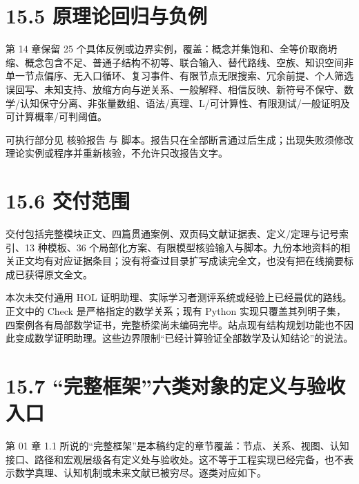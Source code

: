\documentclass[UTF8,a4paper,zihao=-4,fontset=windows,openany]{ctexbook}
\begin{document}
\section{15.5 原理论回归与负例}
第 14 章保留 25 个具体反例或边界实例，覆盖：概念并集饱和、全等价取商坍缩、概念包含不足、普通子结构不初等、联合输入、替代路线、空族、知识空间非单一节点偏序、无入口循环、复习事件、有限节点无限搜索、冗余前提、个人筛选误回写、未知支持、放缩方向与逆关系、一般解释、相信反映、新符号不保守、数学/认知保守分离、非张量数组、语法/真理、L/可计算性、有限测试/一般证明及可计算概率/可判阈值。

可执行部分见 核验报告 与 脚本。报告只在全部断言通过后生成；出现失败须修改理论实例或程序并重新核验，不允许只改报告文字。

\section{15.6 交付范围}
交付包括完整模块正文、四篇贯通案例、双页码文献证据表、定义/定理与记号索引、13 种模板、36 个局部化方案、有限模型核验输入与脚本。九份本地资料的相关正文均有对应证据条目；没有将查过目录扩写成读完全文，也没有把在线摘要标成已获得原文全文。

本次未交付通用 HOL 证明助理、实际学习者测评系统或经验上已经最优的路线。正文中的 Check 是严格指定的数学关系；现有 Python 实现只覆盖其列明子集，四案例各有局部数学证书，完整桥梁尚未编码完毕。站点现有结构规划功能也不因此变成数学证明助理。这些边界限制“已经计算验证全部数学及认知结论”的说法。

\section{15.7 “完整框架”六类对象的定义与验收入口}
第 01 章 1.1 所说的“完整框架”是本稿约定的章节覆盖：节点、关系、视图、认知接口、路径和宏观层级各有定义处与验收处。这不等于工程实现已经完备，也不表示数学真理、认知机制或未来文献已被穷尽。逐类对应如下。
\end{document}
